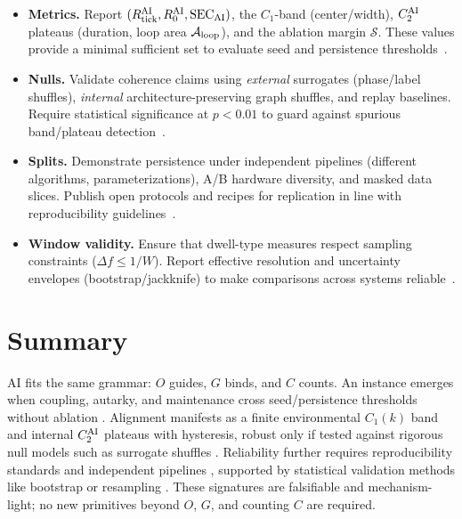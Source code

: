 \documentclass[12pt,a4paper,oneside]{scrreprt}
\begin{document}
\begin{itemize}
  \item \textbf{Metrics.} Report $(R_{\rm tick}^{\rm AI}, R_0^{\rm AI}, \mathrm{SEC}_{\rm AI})$, the $C_1$-band (center/width), $C_2^{\rm AI}$ plateaus (duration, loop area $\mathcal A_{\rm loop}$), and the ablation margin $\mathcal S$. These values provide a minimal sufficient set to evaluate seed and persistence thresholds~\cite{leike2017ai,everitt2021reward}.

  \item \textbf{Nulls.} Validate coherence claims using \emph{external} surrogates (phase/label shuffles), \emph{internal} architecture-preserving graph shuffles, and replay baselines. Require statistical significance at $p<0.01$ to guard against spurious band/plateau detection~\cite{theiler1992testing,small2005surrogate}.

  \item \textbf{Splits.} Demonstrate persistence under independent pipelines (different algorithms, parameterizations), A/B hardware diversity, and masked data slices. Publish open protocols and recipes for replication in line with reproducibility guidelines~\cite{gundersen2018replicability,pineau2021improving}.

  \item \textbf{Window validity.} Ensure that dwell-type measures respect sampling constraints ($\Delta f\le 1/W$). Report effective resolution and uncertainty envelopes (bootstrap/jackknife) to make comparisons across systems reliable~\cite{efron1994introduction,prasad2019statistical}.
\end{itemize}

\section*{Summary}
AI fits the same grammar: $O$ guides, $G$ binds, and $C$ counts. 
An instance emerges when coupling, autarky, and maintenance cross seed/persistence thresholds without ablation \cite{leike2017ai,everitt2021reward}. 
Alignment manifests as a finite environmental $C_1(k)$ band and internal $C_2^{\rm AI}$ plateaus with hysteresis, robust only if tested against rigorous null models such as surrogate shuffles \cite{theiler1992testing,small2005surrogate}. 
Reliability further requires reproducibility standards and independent pipelines \cite{gundersen2018replicability,pineau2021improving}, supported by statistical validation methods like bootstrap or resampling \cite{efron1994introduction,prasad2019statistical}. 
These signatures are falsifiable and mechanism-light; no new primitives beyond $O$, $G$, and counting $C$ are required.
\end{document}
